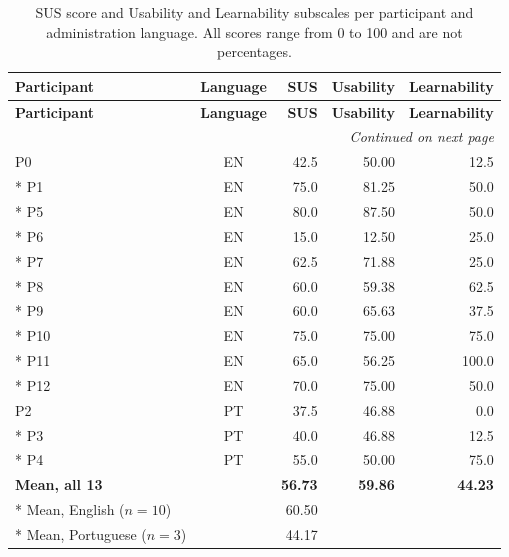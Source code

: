 {\scriptsize
\renewcommand{\arraystretch}{1.05}
\setlength{\tabcolsep}{4pt}

\begin{longtable}{l c r r r}

\caption[\acs{SUS} score and subscales, per participant]{\acs{SUS} score and Usability and Learnability subscales per participant and administration language. All scores range from 0 to 100 and are not percentages.}
\label{tab:sus_scores} \\

\toprule
\textbf{Participant} & \textbf{Language} & \textbf{\acs{SUS}} & \textbf{Usability} & \textbf{Learnability} \\
\midrule
\endfirsthead

\toprule
\textbf{Participant} & \textbf{Language} & \textbf{\acs{SUS}} & \textbf{Usability} & \textbf{Learnability} \\
\midrule
\endhead

\midrule
\multicolumn{5}{r}{\textit{Continued on next page}}\\
\bottomrule
\endfoot

\bottomrule
\endlastfoot

P0  & EN & 42.5 & 50.00 & 12.5 \\*
P1  & EN & 75.0 & 81.25 & 50.0 \\*
P5  & EN & 80.0 & 87.50 & 50.0 \\*
P6  & EN & 15.0 & 12.50 & 25.0 \\*
P7  & EN & 62.5 & 71.88 & 25.0 \\*
P8  & EN & 60.0 & 59.38 & 62.5 \\*
P9  & EN & 60.0 & 65.63 & 37.5 \\*
P10 & EN & 75.0 & 75.00 & 75.0 \\*
P11 & EN & 65.0 & 56.25 & 100.0 \\*
P12 & EN & 70.0 & 75.00 & 50.0 \\
\addlinespace

P2 & PT & 37.5 & 46.88 & 0.0 \\*
P3 & PT & 40.0 & 46.88 & 12.5 \\*
P4 & PT & 55.0 & 50.00 & 75.0 \\
\addlinespace

\midrule
\textbf{Mean, all 13} & & \textbf{56.73} & \textbf{59.86} & \textbf{44.23} \\*
Mean, English ($n = 10$) & & 60.50 & & \\*
Mean, Portuguese ($n = 3$) & & 44.17 & & \\

\end{longtable}
}